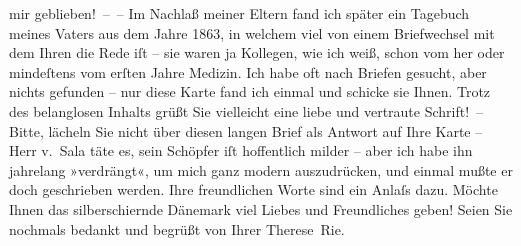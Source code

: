 \begin{ledgroupsized}[t]{13cm}
               mir geblieben! – – Im Nachlaß meiner Eltern fand ich später ein Tagebuch meines Vaters aus dem Jahre 1863, in
               welchem viel von \introOben{}einem Briefwechsel mit\introOben{} dem Ihren die Rede
               iſt – sie waren ja Kollegen, wie ich weiß, schon vom \label{K_L02572-4v}\label{K_L02572-4h} her oder mindeſtens vom erſten
               Jahre Medizin. Ich habe oft nach Briefen gesucht, aber nichts gefunden – nur diese
               Karte fand ich einmal und schicke sie Ihnen. Trotz {\pb}des
               belanglosen Inhalts grüßt Sie vielleicht eine liebe und vertraute Schrift! –\pend
           \pstart
           Bitte, lächeln Sie nicht über diesen langen Brief als Antwort auf Ihre Karte – Herr v. Sala täte es, sein
               Schöpfer iſt hoffentlich milder – aber ich habe ihn jahrelang »verdrängt«, um mich
               ganz modern auszudrücken, und einmal mußte er doch geschrieben werden. Ihre
               freundlichen Worte sind ein Anlaſs dazu. Möchte Ihnen das silberschi{\geminationm}ernde Dänemark viel
               Liebes und Freundliches geben! Seien Sie nochmals bedankt und begrüßt von Ihrer\pend
           \pstart \spacefill\mbox{Therese Rie.}\pend{}          \endnumbering{}\end{ledgroupsized}  \newcommand{\dateiname}{L02572}\newcommand{\titel}{Therese Rie-Andro an Arthur Schnitzler, 3. 5. 1923}\newcommand{\editorInnen}{Martin Anton Müller und Gerd-Hermann Susen}
            \footnotesize
\begin{ledgroupsized}[t]{11.5cm}
\end{ledgroupsized}
         
      